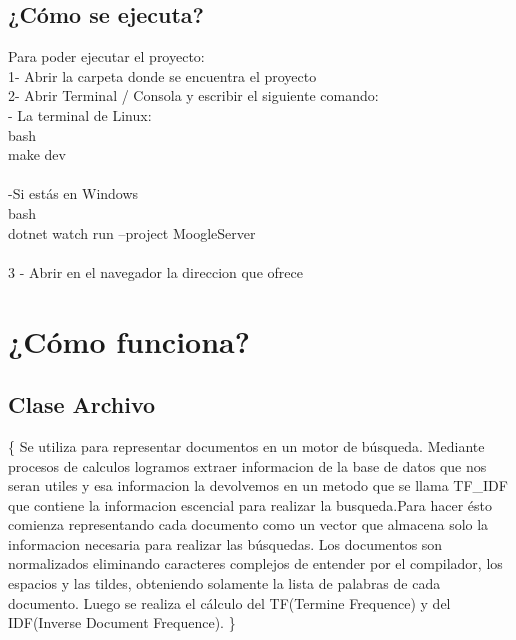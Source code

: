 \documentclass[12]{article}
\begin{document}
\subsection{¿Cómo se ejecuta?}
Para poder ejecutar el proyecto:
\\
1- Abrir la carpeta donde se encuentra el proyecto
\\
2- Abrir Terminal / Consola y escribir el siguiente comando:
\\
- La terminal de Linux:
\\
  bash
\\make dev
\\ 
\\
-Si estás en Windows
\\ 
bash
\\
dotnet watch run --project MoogleServer
\\
\\
3 - Abrir en el navegador la direccion que ofrece

\newpage
\section{¿Cómo funciona?}
\subsection{Clase Archivo}

\{
Se utiliza para representar documentos en un motor de búsqueda. Mediante procesos de 
calculos logramos extraer informacion de la base de datos que nos seran utiles y esa 
informacion la devolvemos en un metodo que se llama TF\_IDF que contiene la informacion 
escencial para realizar la busqueda.Para hacer ésto comienza representando cada documento 
como un vector que almacena solo la informacion necesaria para realizar las búsquedas. Los 
documentos son normalizados eliminando caracteres complejos de entender por el 
compilador, los espacios y las tildes, obteniendo solamente la lista de palabras de cada
documento. Luego se realiza el cálculo del TF(Termine Frequence) y del IDF(Inverse Document 
Frequence).
\}
\end{document}
